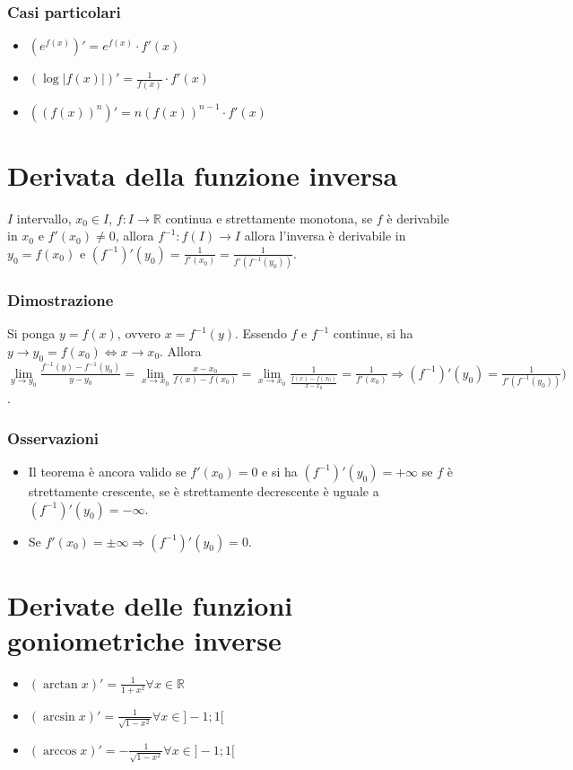 \subsubsection{Casi particolari}
\begin{itemize}
\item $(e^{f(x)})'=e^{f(x)}\cdot f'(x)$
\item $(\log |f(x)|)'=\frac{1}{f(x)}\cdot f'(x)$
\item $((f(x))^n)'=n(f(x))^{n-1}\cdot f'(x)$
\end{itemize}
\section{Derivata della funzione inversa}
$I$ intervallo, $x_0\in I$, $f:I\rightarrow\mathbb{R}$ continua e strettamente monotona, se $f$ \`e derivabile in $x_0$ e $f'(x_0)\neq 0$, allora $f^{-1}:f(I)\rightarrow I$
allora l'inversa \`e derivabile in $y_0=f(x_0)$ e $(f^{-1})'(y_0)=\frac{1}{f'(x_0)}=\frac{1}{f'(f^{-1}(y_0))}$.
\subsubsection{Dimostrazione}
Si ponga $y=f(x)$, ovvero $x=f^{-1}(y)$. Essendo $f$ e $f^{-1}$ continue, si ha $y\rightarrow y_0=f(x_0)\Leftrightarrow x\rightarrow x_0$. Allora $\lim\limits_{y\rightarrow 
y_0}\frac{f^{-1}(y)-f^{-1}(y_0)}{y-y_0}=\lim\limits_{x\rightarrow x_0}\frac{x-x_0}{f(x)-f(x_0)}=\lim\limits_{x\rightarrow x_0}\frac{1}{\frac{f(x)-f(x_0)}{x-x_0}}=\frac{1}
{f'(x_0)}\Rightarrow (f^{-1})'(y_0)=\frac{1}{f'(f^{-1}(y_0))})$.
\subsubsection{Osservazioni}
\begin{itemize}
\item Il teorema \`e ancora valido se $f'(x_0)=0$ e si ha $(f^{-1})'(y_0)=+\infty$ se $f$ \`e strettamente crescente, se \`e strettamente decrescente \`e uguale a 
$(f^{-1})'(y_0)=-\infty$. 
\item Se $f'(x_0)=\pm\infty\Rightarrow (f^{-1})'(y_0)=0$.
\end{itemize}
\section{Derivate delle funzioni goniometriche inverse}
\begin{itemize}
\item $(\arctan x)'=\frac{1}{1+x^2}\forall x\in\mathbb{R}$
\item $(\arcsin x)'=\frac{1}{\sqrt{1-x^2}}\forall x\in ]-1;1[$
\item $(\arccos x)'=-\frac{1}{\sqrt{1-x^2}}\forall x\in ]-1;1[$
\end{itemize}
